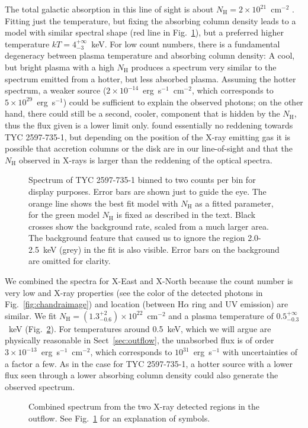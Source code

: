 \documentclass[linenumbers]{aastex631}
\begin{document}
The total galactic absorption in this line of sight is about $N_\mathrm{H}=2\times10^{21}$~cm$^{-2}$ \citep{1990ARA&A..28..215D}. Fitting just the temperature, but fixing the absorbing column density leads to a model with similar spectral shape (red line in Fig.~\ref{fig:TYC_spec}), but a preferred higher temperature $kT=4_{-3}^{+\infty}$~keV.
For low count numbers, there is a fundamental degeneracy between plasma temperature and absorbing column density: A cool, but bright plasma with a high $N_\mathrm{H}$ produces a spectrum very similar to the spectrum emitted from a hotter, but less absorbed plasma.
Assuming the hotter spectrum, a weaker source ($2\times10^{-14}$~erg~s$^{-1}$~cm$^{-2}$, which corresponds to $5\times 10^{29}$~erg~s$^{-1}$) could be sufficient to explain the observed photons; on the other hand, there could still be a second, cooler, component that is hidden by the $N_\mathrm{H}$, thus the flux given is a lower limit only. \cite{2020Natur.587..387H} found essentially no reddening towards TYC 2597-735-1, but depending on the position of the X-ray emitting gas it is possible that accretion columns or the disk are in our line-of-sight and that the $N_\mathrm{H}$ observed in X-rays is larger than the reddening of the optical spectra.

\begin{figure}
    \caption{Spectrum of TYC 2597-735-1 binned to two counts per bin for display purposes. Error bars are shown just to guide the eye. The orange line shows the best fit model with $N_\mathrm{H}$ as a fitted parameter, for the green model $N_\mathrm{H}$ is fixed as described in the text. Black crosses show the background rate, scaled from a much larger area. The background feature that caused us to ignore the region 2.0-2.5~keV (grey) in the fit is also visible. Error bars on the background are omitted for clarity.
    \label{fig:TYC_spec}}
\end{figure}

We combined the spectra for X-East and X-North because the count number is very low and X-ray properties (see the color of the detected photons in Fig.~\ref{fig:chandraimage}) and location (between H$\alpha$ ring and UV emission) are similar.
We fit $N_\mathrm{H}=(1.3_{-0.6}^{+2})\times10^{22}$~cm$^{-2}$ and a plasma temperature of $0.5_{-0.3}^{+\infty}$~keV (Fig.~\ref{fig:combined}). For temperatures around 0.5~keV, which we will argue are physically reasonable in Sect~\ref{sec:outflow}, the unabsorbed flux is of order $3 \times 10^{-13}$~erg~s$^{-1}$~cm$^{-2}$, which corresponds to $10^{31}$~erg~s$^{-1}$ with uncertainties of a factor a few. As in the case for TYC 2597-735-1, a hotter source with a lower flux seen through a lower absorbing column density could also generate the observed spectrum.
\begin{figure}
    \caption{Combined spectrum from the two X-ray detected regions in the outflow. See Fig.~\ref{fig:TYC_spec} for an explanation of symbols.
    \label{fig:combined}}
\end{figure}
\end{document}
